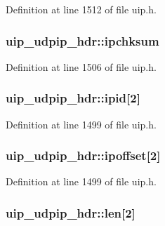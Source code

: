 Definition at line 1512 of file uip.h.

\hypertarget{structuip__udpip__hdr_af20186ef441ef5b600e8544a0f2d8d81}{
\subsubsection[{ipchksum}]{ {\bf uip\_\-udpip\_\-hdr::ipchksum}}}
\label{structuip__udpip__hdr_af20186ef441ef5b600e8544a0f2d8d81}


Definition at line 1506 of file uip.h.

\hypertarget{structuip__udpip__hdr_a569382bc53aa64c227e57efe88fe13ac}{
\subsubsection[{ipid}]{ {\bf uip\_\-udpip\_\-hdr::ipid}\mbox{[}2\mbox{]}}}
\label{structuip__udpip__hdr_a569382bc53aa64c227e57efe88fe13ac}


Definition at line 1499 of file uip.h.

\hypertarget{structuip__udpip__hdr_a8587178a29882482be20c2822b402b96}{
\subsubsection[{ipoffset}]{ {\bf uip\_\-udpip\_\-hdr::ipoffset}\mbox{[}2\mbox{]}}}
\label{structuip__udpip__hdr_a8587178a29882482be20c2822b402b96}


Definition at line 1499 of file uip.h.

\hypertarget{structuip__udpip__hdr_a47140aa52cb9e6a2de38fdfc5da08df1}{
\subsubsection[{len}]{ {\bf uip\_\-udpip\_\-hdr::len}\mbox{[}2\mbox{]}}}
\label{structuip__udpip__hdr_a47140aa52cb9e6a2de38fdfc5da08df1}


